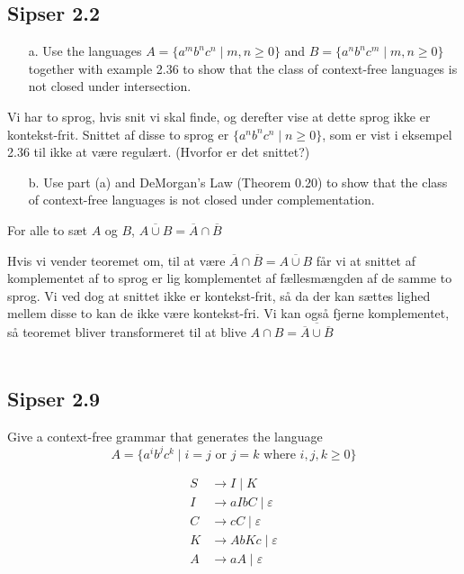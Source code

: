\noindent
\subsection*{Sipser 2.2}
\noindent
\begin{enumerate}
	\item[a.] Use the languages $A = \{a^{m}b^{n}c^{n} \; | \; m,n \ge 0\}$ and $B = \{a^{n}b^{n}c^{m} \; | \; m,n \ge 0\}$ together with example 2.36 to show that the class of context-free languages is not closed under intersection.
\end{enumerate}

Vi har to sprog, hvis snit vi skal finde, og derefter vise at dette sprog ikke er kontekst-frit. Snittet af disse to sprog er $\{a^{n}b^{n}c^{n}\; | \; n \ge 0\}$, som er vist i eksempel 2.36 til ikke at være regulært. (Hvorfor er det snittet?)

\begin{enumerate}
	\item[b.] Use part (a) and DeMorgan's Law (Theorem 0.20) to show that the class of context-free languages is not closed under complementation.
\end{enumerate}

\begin{theorem}
	For alle to sæt $A$ og $B$, $\overline{A \cup B} = \overline{A} \cap \overline{B}$
\end{theorem}

Hvis vi vender teoremet om, til at være $\overline{A} \cap \overline{B} = \overline{A \cup B}$ får vi at snittet af komplementet af to sprog er lig komplementet af fællesmængden af de samme to sprog. Vi ved dog at snittet ikke er kontekst-frit, så da der kan sættes lighed mellem disse to kan de ikke være kontekst-fri. Vi kan også fjerne komplementet, så teoremet bliver transformeret til at blive $A \cap B = \overline{\overline{A} \cup \overline{B}}$\\\\

\noindent
\subsection*{Sipser 2.9}
\noindent
Give a context-free grammar that generates the language
\[ A = \{a^{i}b^{j}c^{k}\; | \; i = j \text{ or }j = k \text{ where } i,j,k \ge 0 \}\]

\begin{equation*}
	\begin{split}
		S &\rightarrow I\;|\;K \\
		I &\rightarrow aIbC\;|\; \varepsilon\\
		C &\rightarrow cC\;|\; \varepsilon\\
		K &\rightarrow AbKc \;| \; \varepsilon\\
		A &\rightarrow aA \; | \; \varepsilon
	\end{split}
\end{equation*}
\\\\

